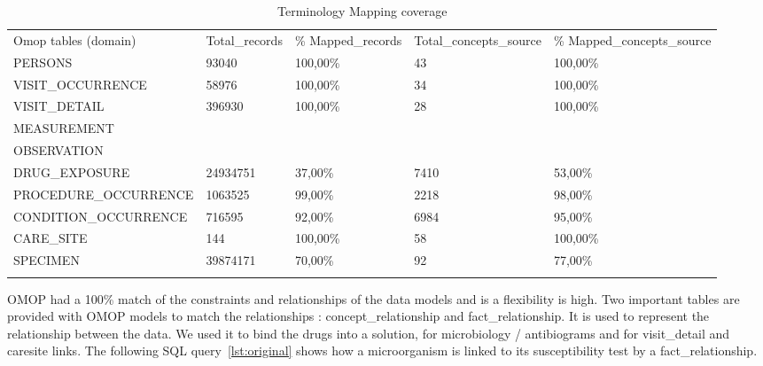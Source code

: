 \begin{table*}[t]
\caption{Terminology Mapping coverage}
\begin{tabular}{@{}lllll@{}}\toprule
Omop tables (domain)   & Total\_records & \% Mapped\_records  & Total\_concepts\_source & \% Mapped\_concepts\_source  \\\colrule
PERSONS                & 93040          & 100,00\%            & 43                      & 100,00\%                     \\
VISIT\_OCCURRENCE      & 58976          & 100,00\%            & 34                      & 100,00\%                     \\
VISIT\_DETAIL          & 396930         & 100,00\%            & 28                      & 100,00\%                     \\
MEASUREMENT            &                &                     &                         &                              \\
OBSERVATION            &                &                     &                         &                              \\
DRUG\_EXPOSURE         & 24934751       & 37,00\%             & 7410                    & 53,00\%                      \\
PROCEDURE\_OCCURRENCE  & 1063525        & 99,00\%             & 2218                    & 98,00\%                      \\
CONDITION\_OCCURRENCE  & 716595         & 92,00\%             & 6984                    & 95,00\%                      \\
CARE\_SITE             & 144            & 100,00\%            & 58                      & 100,00\%                     \\
SPECIMEN               & 39874171       & 70,00\%             & 92                      & 77,00\%                      \\\botrule
\end{tabular}
\label{table:mapping}
\end{table*}

OMOP had a 100\% match of the constraints and relationships of the data models
and is a flexibility is high. 
Two important tables are provided with OMOP models to match the relationships : 
concept\_relationship and fact\_relationship. It is used to represent the 
relationship between the data. We used it to bind the drugs into a solution, 
for microbiology / antibiograms and for visit\_detail and caresite links. 
The following SQL query~\ref{lst:original} shows how a microorganism is linked to its susceptibility 
test by a fact\_relationship.

